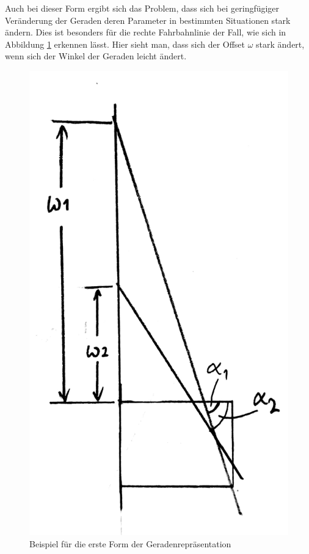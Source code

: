 \documentclass[a4paper,12pt]{article}
\begin{document}
	Auch bei dieser Form ergibt sich das Problem, dass sich bei geringfügiger Veränderung der Geraden deren Parameter in bestimmten Situationen stark ändern. Dies ist besonders für die rechte Fahrbahnlinie der Fall, wie sich in Abbildung \ref{fig:alpha_omega2} erkennen lässt. Hier sieht man, dass sich der Offset $\omega$ stark ändert, wenn sich der Winkel der Geraden leicht ändert.


	\begin{figure}[H]
		\centering
		\includegraphics[width=.3\linewidth]{images/alpha_omega2.jpg}
		\caption{Beispiel für die erste Form der Geradenrepräsentation}
		\label{fig:alpha_omega2}
	\end{figure}
	
	
	
	
	
	
 
	
	


      \newpage
      
\end{document}
